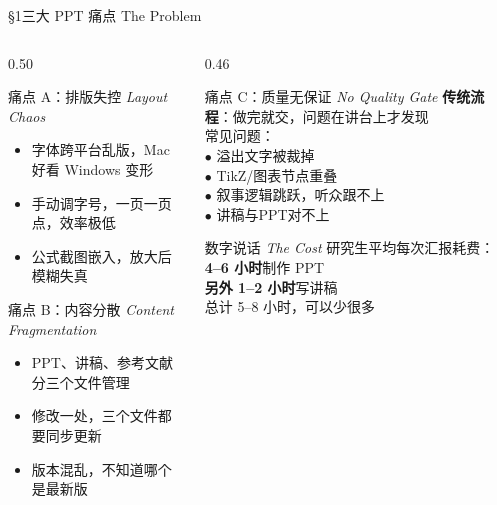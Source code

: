 \documentclass[aspectratio=169,10pt]{beamer}
\newcommand{\EN}[1]{\textit{#1}}
\newcommand{\sectag}[1]{\textmd{\small\normalfont\textcolor{deepblue!60}{#1}}}
\begin{document}
\begin{frame}{\S1\quad 三大 PPT 痛点 \sectag{The Problem}}
  \begin{columns}[T]
    \begin{column}{0.50\textwidth}
      \begin{block}{痛点 A：排版失控 \EN{Layout Chaos}}
        \footnotesize
        \begin{itemize}
          \item 字体跨平台乱版，Mac 好看 Windows 变形
          \item 手动调字号，一页一页点，效率极低
          \item 公式截图嵌入，放大后模糊失真
        \end{itemize}
      \end{block}
      \vspace{4pt}
      \begin{block}{痛点 B：内容分散 \EN{Content Fragmentation}}
        \footnotesize
        \begin{itemize}
          \item PPT、讲稿、参考文献分三个文件管理
          \item 修改一处，三个文件都要同步更新
          \item 版本混乱，不知道哪个是最新版
        \end{itemize}
      \end{block}
    \end{column}
    \begin{column}{0.46\textwidth}
      \begin{alertblock}{\small 痛点 C：质量无保证 \EN{No Quality Gate}}
        \footnotesize
        \textbf{传统流程}：做完就交，问题在讲台上才发现\\[4pt]
        常见问题：\\
        \quad $\bullet$ 溢出文字被裁掉\\
        \quad $\bullet$ TikZ/图表节点重叠\\
        \quad $\bullet$ 叙事逻辑跳跃，听众跟不上\\
        \quad $\bullet$ 讲稿与PPT对不上
      \end{alertblock}
      \vspace{4pt}
      \begin{exampleblock}{\small 数字说话 \EN{The Cost}}
        \footnotesize
        研究生平均每次汇报耗费：\\
        \textbf{4--6 小时}制作 PPT\\
        \textbf{另外 1--2 小时}写讲稿\\
        \alert{总计 5--8 小时，可以少很多}
      \end{exampleblock}
    \end{column}
  \end{columns}
\end{frame}
\end{document}
